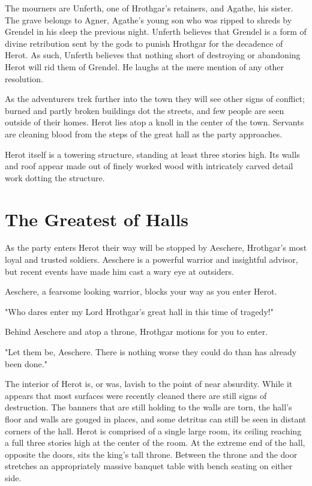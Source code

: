 \documentclass[10pt,twoside,twocolumn,openany]{book}
\begin{document}
The mourners are Unferth, one of Hrothgar's retainers, and Agathe, his sister. The grave belongs to Agner, Agathe's young son who was ripped to shreds by Grendel in his sleep the previous night. Unferth believes that Grendel is a form of divine retribution sent by the gods to punish Hrothgar for the decadence of Herot. As such, Unferth believes that nothing short of destroying or abandoning Herot will rid them of Grendel. He laughs at the mere mention of any other resolution.

As the adventurers trek further into the town they will see other signs of conflict; burned and partly broken buildings dot the streets, and few people are seen outside of their homes. Herot lies atop a knoll in the center of the town. Servants are cleaning blood from the steps of the great hall as the party approaches.

Herot itself is a towering structure, standing at least three stories high. Its walls and roof appear made out of finely worked wood with intricately carved detail work dotting the structure.

\section{The Greatest of Halls}
As the party enters Herot their way will be stopped by Aeschere, Hrothgar's most loyal and trusted soldiers. Aeschere is a powerful warrior and insightful advisor, but recent events have made him cast a wary eye at outsiders.

\begin{quotebox}
Aeschere, a fearsome looking warrior, blocks your way as you enter Herot.

"Who dares enter my Lord Hrothgar's great hall in this time of tragedy!"

Behind Aeschere and atop a throne, Hrothgar motions for you to enter.

"Let them be, Aeschere. There is nothing worse they could do than has already been done."
\end{quotebox}

The interior of Herot is, or was, lavish to the point of near absurdity. While it appears that most surfaces were recently cleaned there are still signs of destruction. The banners that are still holding to the walls are torn, the hall's floor and walls are gouged in places, and some detritus can still be seen in distant corners of the hall. Herot is comprised of a single large room, its ceiling reaching a full three stories high at the center of the room. At the extreme end of the hall, opposite the doors, sits the king's tall throne. Between the throne and the door stretches an appropriately massive banquet table with bench seating on either side.
\end{document}
